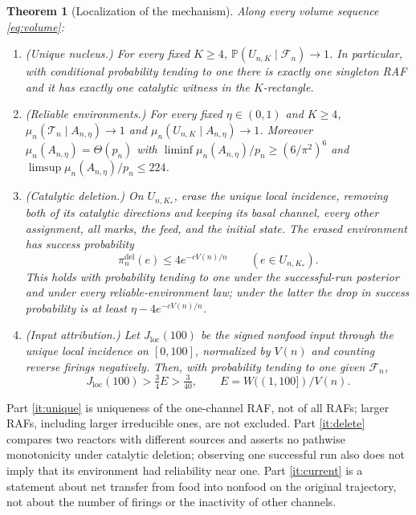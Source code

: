 \documentclass[11pt,letterpaper]{article}
\theoremstyle{plain}
\newtheorem{theorem}{Theorem}[section]
\theoremstyle{definition}
\theoremstyle{remark}
\numberwithin{equation}{section}
\newcommand{\PP}{\mathbb P}
\newcommand{\cF}{\mathcal F}
\newcommand{\cT}{\mathcal T}
\newcommand{\loc}{\mathrm{loc}}
\newcommand{\del}{\mathrm{del}}
\begin{document}
\begin{theorem}[Localization of the mechanism]\label{thm:local}
Along every volume sequence \eqref{eq:volume}:
\begin{enumerate}[label=\textup{(\alph*)}]
\item\label{it:unique} \textup{(Unique nucleus.)} For every fixed $K\ge4$, $\PP(U_{n,K}\mid\cF_n)\to1$. In particular, with conditional probability tending to one there is exactly one singleton RAF and it has exactly one catalytic witness in the $K$-rectangle.
\item\label{it:reliable} \textup{(Reliable environments.)} For every fixed $\eta\in(0,1)$ and $K\ge4$, $\mu_n(\cT_n\mid A_{n,\eta})\to1$ and $\mu_n(U_{n,K}\mid A_{n,\eta})\to1$. Moreover $\mu_n(A_{n,\eta})=\Theta(p_n)$ with $\liminf\mu_n(A_{n,\eta})/p_n\ge(6/\pi^2)^6$ and $\limsup\mu_n(A_{n,\eta})/p_n\le224$.
\item\label{it:delete} \textup{(Catalytic deletion.)} On $U_{n,K_*}$, erase the unique local incidence, removing both of its catalytic directions and keeping its basal channel, every other assignment, all marks, the feed, and the initial state. The erased environment has success probability
\begin{equation}\label{eq:delete}
 \pi_n^{\del}(e)\le4e^{-cV(n)/n}\qquad(e\in U_{n,K_*}) .
\end{equation}
This holds with probability tending to one under the successful-run posterior and under every reliable-environment law; under the latter the drop in success probability is at least $\eta-4e^{-cV(n)/n}$.
\item\label{it:current} \textup{(Input attribution.)} Let $J_\loc(100)$ be the signed nonfood input through the unique local incidence on $[0,100]$, normalized by $V(n)$ and counting reverse firings negatively. Then, with probability tending to one given $\cF_n$,
\begin{equation}\label{eq:current}
 J_\loc(100)>\tfrac34E>\tfrac3{40},\qquad E=W((1,100])/V(n) .
\end{equation}
\end{enumerate}
\end{theorem}
Part \ref{it:unique} is uniqueness of the one-channel RAF, not of all RAFs; larger RAFs, including larger irreducible ones, are not excluded. Part \ref{it:delete} compares two reactors with different sources and asserts no pathwise monotonicity under catalytic deletion; observing one successful run also does not imply that its environment had reliability near one. Part \ref{it:current} is a statement about net transfer from food into nonfood on the original trajectory, not about the number of firings or the inactivity of other channels.
\end{document}
